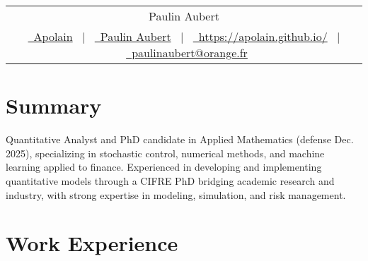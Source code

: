 \documentclass[a4paper,11pt]{article}
\begin{document}
\pagestyle{empty} 

	\begin{tabularx}{\linewidth}{@{} C @{}}
	\Huge{Paulin Aubert} \\[7.5pt]
	\href{https://github.com/apolain/}{\raisebox{-0.05\height}\faGithub\ Apolain} \ $|$ \ 
	\href{https://www.linkedin.com/in/paulinaubert/}{\raisebox{-0.05\height}\faLinkedin\ Paulin Aubert} \ $|$ \ 
	\href{https://apolain.github.io/}{\raisebox{-0.05\height}\faGlobe \ https://apolain.github.io/} \ $|$ \ 
	\href{mailto:paulinaubert@orange.fr}{\raisebox{-0.05\height}\faEnvelope \ paulinaubert@orange.fr} \\
	\end{tabularx}

	\section{Summary}
	Quantitative Analyst and PhD candidate in Applied Mathematics (defense Dec. 2025), specializing in stochastic control, numerical methods, and machine learning applied to finance.
	Experienced in developing and implementing quantitative models through a CIFRE PhD bridging academic research and industry, with strong expertise in modeling, simulation, and risk management.
	
	\section{Work Experience}
\end{document}
